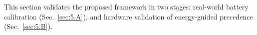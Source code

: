 This section validates the proposed framework in two stages: real-world battery calibration (Sec.~\ref{sec:5.A}), and hardware validation of energy-guided precedence (Sec.~\ref{sec:5.B}).